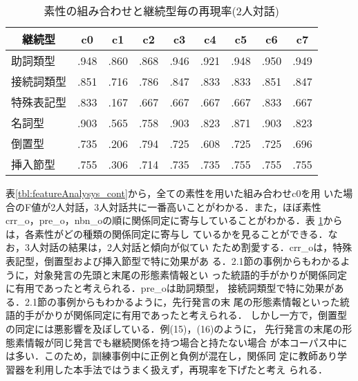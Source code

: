 \begin{table}[tbt]
\small
  \begin{center}
    \caption{素性の組み合わせと継続型毎の再現率(2人対話)}
    \label{tbl:cont-featureByType-2}
    \begin{tabular}{|l|cccccccc|}
      \hline
      \multicolumn{1}{|c|}{継続型}& c0 & c1 & c2 & c3 & c4 & c5 & c6 & c7 \\
      \hline
      助詞類型 &.948&.860&.868&.946&.921&.948&.950&.949\\
      接続詞類型  &.851&.716&.786&.847&.833&.833&.851&.847\\
      特殊表記型  &.833&.167&.667&.667&.667&.667&.833&.667\\
      名詞型  &.903&.565&.758&.903&.823&.871&.903&.823\\
      倒置型  &.735&.206&.794&.725&.608&.725&.725&.696\\
      挿入節型  &.755&.306&.714&.735&.735&.755&.755&.755\\
     \hline
   \end{tabular}
  \end{center}
\end{table}

表\ref{tbl:featureAnalysys_cont}から，全ての素性を用いた組み合わせc0を用
いた場合のF値が2人対話，3人対話共に一番高いことがわかる．また，ほぼ素性
crr\_o，pre\_o，nbn\_oの順に関係同定に寄与していることがわかる．表
\ref{tbl:cont-featureByType-2}からは，各素性がどの種類の関係同定に寄与し
ているかを見ることができる．なお，3人対話の結果は，2人対話と傾向が似てい
たため割愛する．crr\_oは，特殊表記型，倒置型および挿入節型で特に効果があ
る．2.1節の事例からもわかるように，対象発言の先頭と末尾の形態素情報とい
った統語的手がかりが関係同定に有用であったと考えられる．pre\_oは助詞類型，
接続詞類型で特に効果がある．2.1節の事例からもわかるように，先行発言の末
尾の形態素情報といった統語的手がかりが関係同定に有用であったと考えられる．
しかし一方で，倒置型の同定には悪影響を及ぼしている．例(15)，(16)のように，
先行発言の末尾の形態素情報が同じ発言でも継続関係を持つ場合と持たない場合
が本コーパス中には多い．このため，訓練事例中に正例と負例が混在し，関係同
定に教師あり学習器を利用した本手法ではうまく扱えず，再現率を下げたと考え
られる．



